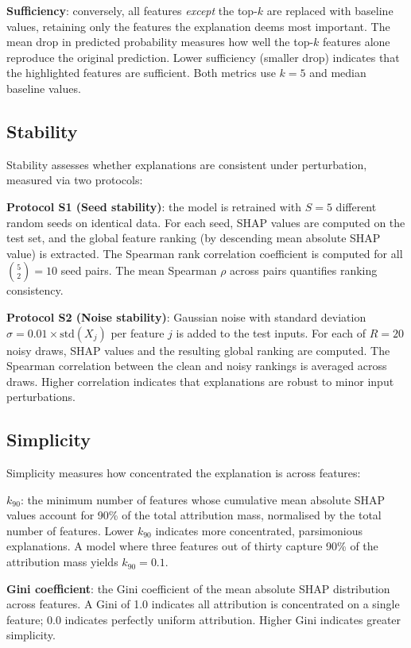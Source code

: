 \documentclass[12pt,a4paper]{report}
\begin{document}
\textbf{Sufficiency}: conversely, all features \emph{except} the top-$k$ are replaced with baseline values, retaining only the features the explanation deems most important. The mean drop in predicted probability measures how well the top-$k$ features alone reproduce the original prediction. Lower sufficiency (smaller drop) indicates that the highlighted features are sufficient. Both metrics use $k = 5$ and median baseline values.

\subsection{Stability}
\label{sec:stability}

Stability assesses whether explanations are consistent under perturbation, measured via two protocols:

\textbf{Protocol S1 (Seed stability)}: the model is retrained with $S = 5$ different random seeds on identical data. For each seed, SHAP values are computed on the test set, and the global feature ranking (by descending mean absolute SHAP value) is extracted. The Spearman rank correlation coefficient is computed for all $\binom{5}{2} = 10$ seed pairs. The mean Spearman $\rho$ across pairs quantifies ranking consistency.

\textbf{Protocol S2 (Noise stability)}: Gaussian noise with standard deviation $\sigma = 0.01 \times \text{std}(X_j)$ per feature $j$ is added to the test inputs. For each of $R = 20$ noisy draws, SHAP values and the resulting global ranking are computed. The Spearman correlation between the clean and noisy rankings is averaged across draws. Higher correlation indicates that explanations are robust to minor input perturbations.

\subsection{Simplicity}
\label{sec:simplicity}

Simplicity measures how concentrated the explanation is across features:

\textbf{$k_{90}$}: the minimum number of features whose cumulative mean absolute SHAP values account for 90\% of the total attribution mass, normalised by the total number of features. Lower $k_{90}$ indicates more concentrated, parsimonious explanations. A model where three features out of thirty capture 90\% of the attribution mass yields $k_{90} = 0.1$.

\textbf{Gini coefficient}: the Gini coefficient of the mean absolute SHAP distribution across features. A Gini of 1.0 indicates all attribution is concentrated on a single feature; 0.0 indicates perfectly uniform attribution. Higher Gini indicates greater simplicity.
\end{document}
